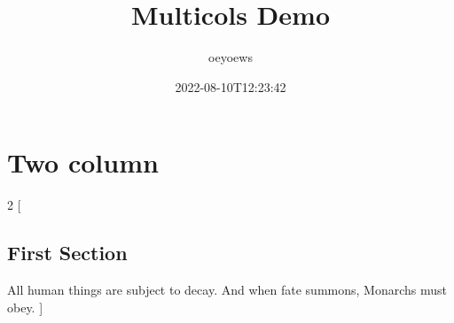 \documentclass{article}
\title{Multicols Demo}
\author{oeyoews}
\date{2022-08-10T12:23:42}
\begin{document}
\maketitle

\section{ Two column}%
\label{sec: Two column}

\begin{multicols}{2}
	[
		\subsection{First Section}
		All human things are subject to decay. And when fate summons, Monarchs must obey.
	]
\end{multicols}
\end{document}
